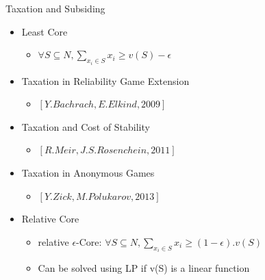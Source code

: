 \documentclass{beamer}
\begin{document}
\begin{frame}{Taxation and Subsiding}
    \begin{itemize}        
        \item Least Core
        \begin{itemize}
            \item $\forall S \subseteq N, \sum_{x_i \in S} x_i \geq v(S) - \epsilon$
        \end{itemize}
        \item Taxation in Reliability Game Extension
        \begin{itemize}
            \item $[Y. Bachrach, E. Elkind, 2009]$
        \end{itemize}
        \item Taxation and Cost of Stability
        \begin{itemize}
            \item $[R. Meir, J. S. Rosenchein, 2011]$
        \end{itemize}
        \item Taxation in Anonymous Games
        \begin{itemize}
            \item $[Y. Zick, M. Polukarov, 2013]$
        \end{itemize}
        \item Relative Core
        \begin{itemize}
            \item relative $\epsilon$-Core: $\forall S \subseteq N, \sum_{x_i \in S} x_i \geq (1-\epsilon).v(S)$
            \item Can be solved using LP if v(S) is a linear function
        \end{itemize}
    \end{itemize}
\end{frame}
\end{document}
